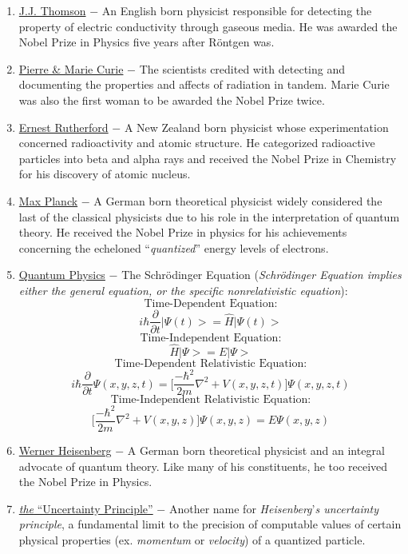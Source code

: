 \documentclass[12pt]{article}
\begin{document}
\begin{flushleft}
\begin{enumerate}
\item \underline{J.J. Thomson} $-$ An English born physicist responsible for detecting the property of electric conductivity through gaseous media. He was awarded the Nobel Prize in Physics five years after R\"ontgen was.

\item \underline{Pierre \& Marie Curie} $-$ The scientists credited with detecting and documenting the properties and affects of radiation in tandem. Marie Curie was also the first woman to be awarded the Nobel Prize twice.

\item \underline{Ernest Rutherford} $-$ A New Zealand born physicist whose experimentation concerned radioactivity and atomic structure. He categorized radioactive particles into beta and alpha rays and received the Nobel Prize in Chemistry for his discovery of atomic nucleus.

\item \underline{Max Planck} $-$ A German born theoretical physicist widely considered the last of the classical physicists due to his role in the interpretation of quantum theory. He received the Nobel Prize in physics for his achievements concerning the echeloned ``\emph{quantized}'' energy levels of electrons. 

\item \underline{Quantum Physics} $-$ The Schr\"odinger Equation (\emph{Schr\"odinger Equation implies either the general equation, or the specific nonrelativistic equation}):
$$ \text{Time-Dependent Equation:} $$
$$ i\hbar\frac{\partial}{\partial t}\bigl| \Psi(t)\bigr>=\hat{H}\bigr|\Psi(t)\bigr>$$
$$ \text{Time-Independent Equation:} $$
$$ \hat{H}\bigr|\Psi\bigr>=E\bigr|\Psi\bigr>$$
$$ \text{Time-Dependent Relativistic Equation:} $$
$$ i\hbar\frac{\partial}{\partial t}\Psi(x,y,z,t) = \biggl[ \frac{-\hbar^2}{2m}\nabla^2 +V(x,y,z,t)\biggr]\Psi(x,y,z,t)$$
$$ \text{Time-Independent Relativistic Equation:} $$
$$ \biggl[ \frac{-\hbar^2}{2m}\nabla^2 +V(x,y,z)\biggr]\Psi(x,y,z) = E\Psi(x,y,z) $$

\item \underline{Werner Heisenberg} $-$ A German born theoretical physicist and an integral advocate of quantum theory. Like many of his constituents, he too received the Nobel Prize in Physics.

\item \underline{\emph{the} ``Uncertainty Principle''} $-$ Another name for \emph{Heisenberg}'\emph{s uncertainty principle}, a fundamental limit to the precision of computable values of certain physical properties (ex. \emph{momentum} or \emph{velocity}) of a quantized particle.


\end{enumerate}
\end{flushleft}
\end{document}
